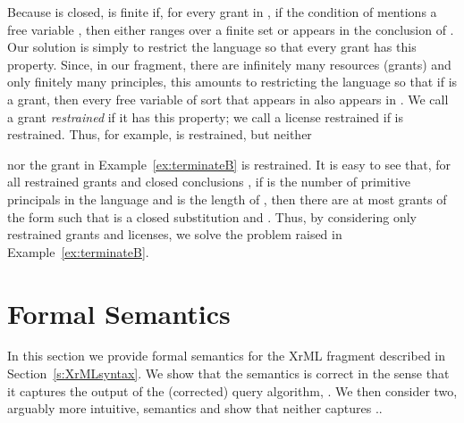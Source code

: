 \documentclass{acmtrans2m}
\newcommand{\<}{
}
\renewcommand{\>}{\rangle}
\begin{document}
Because  is closed,  is finite if, for every grant  in , if the
condition of  mentions a free variable , then either  ranges over a finite set
or  appears in the conclusion of .  Our solution is simply to restrict the language
so that every grant has this property.  Since, in our fragment, there are infinitely many
resources (grants) and only finitely many principles, this amounts to restricting the
language so that if  is a grant, then
every free variable of sort  that appears in  also appears in .
We call a grant \emph{restrained} if it has this property; we call a license 
restrained if  is restrained.  Thus, for example,
 is restrained, but neither

nor the grant  in Example~\ref{ex:terminateB} is restrained.
It is easy to see that, for all restrained grants
 and closed conclusions , if 
is the number of primitive principals in the language and  is the length of , then
there are at most  grants of the form  such that
 is a closed substitution and .  Thus, by considering only
restrained grants and licenses, we solve the problem raised in Example~\ref{ex:terminateB}.

\section{Formal Semantics}\label{s:semantics-xrml}
In this section we provide formal semantics for the XrML fragment described in
Section~\ref{s:XrMLsyntax}.
We show that the semantics is correct 
in the sense that 
it captures the output of the (corrected) query algorithm, .
We then consider two, arguably more intuitive,
semantics and show that neither captures ..
\end{document}
